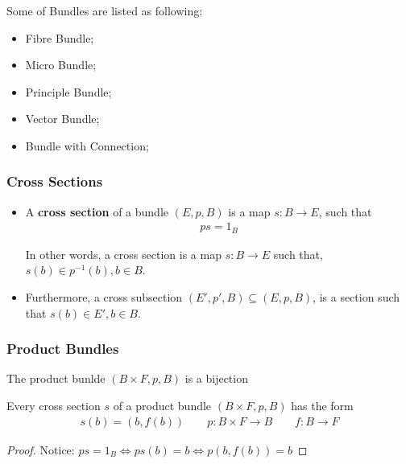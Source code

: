 \documentclass[Total.tex]{subfiles}
\begin{document}
	Some of Bundles are listed as following:
	\begin{itemize}
		\item Fibre Bundle;
		\item Micro Bundle;
		\item Principle Bundle;
		\item Vector Bundle;
		\item Bundle with Connection;
	\end{itemize}
	
	\subsubsection{Cross Sections}
	\begin{Def}
		\begin{itemize}
			\item 
			A \textbf{cross section} of a bundle $(E,p,B)$ is a map $s:B\rightarrow E$, such that
			\begin{gather*}
				ps=1_B
			\end{gather*}
			
			In other words, a cross section is a map $s:B\rightarrow E$ such that, $s(b)\in p^{-1}(b),b\in B$. 
			\item Furthermore, a cross subsection $(E',p',B)\subseteq (E,p,B)$, is a section such that $s(b)\in E',b\in B$.
		\end{itemize}
	\end{Def}
	
	\subsubsection{Product Bundles}
	\begin{Def}
		The product bunlde $(B\times F ,p,B)$ is a bijection 
	\end{Def}
	
	\begin{proposition}
		Every cross section $s$ of a product bundle $(B\times F,p,B)$ has the form
		\begin{gather*}
			s(b)=(b,f(b))\qquad p:B\times F\rightarrow B\qquad f: B\rightarrow F
		\end{gather*}
	\end{proposition}
	\begin{proof}
		Notice: $ps=1_B\Leftrightarrow  ps(b)=b\Leftrightarrow p(b,f(b))=b$
	\end{proof}
\end{document}
